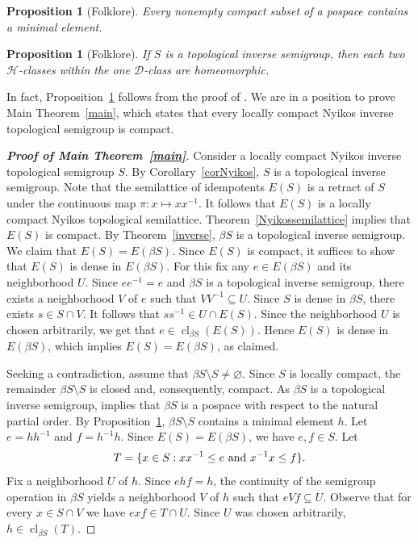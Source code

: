 \documentclass[12pt, twoside, leqno]{article}
\newtheorem{proposition}[theorem]{Proposition}
\theoremstyle{definition}
\numberwithin{equation}{section}
\newcommand{\cl}{\operatorname{cl}}
\begin{document}
\begin{proposition}[Folklore]\label{minposet}
Every nonempty compact subset of a pospace contains a minimal element.    
\end{proposition}

\begin{proposition}[Folklore]\label{Dclass}
 If $S$ is a topological inverse semigroup, then each two $\mathcal H$-classes within the one $\mathcal D$-class are homeomorphic.   
\end{proposition}

In fact, Proposition~\ref{Dclass} follows from the proof of \cite[Lemma~2.2.3]{Howie}. We are in a position to prove Main Theorem~\ref{main}, which states that every locally compact Nyikos inverse topological semigroup is compact. 

\begin{proof}[{\bf Proof of Main Theorem~\ref{main}}]
Consider a locally compact Nyikos inverse topological semigroup $S$. By Corollary~\ref{corNyikos}, $S$ is a topological inverse semigroup. Note that the semilattice of idempotents $E(S)$ is a retract of $S$ under the continuous map $\pi: x\mapsto xx^{-1}$. It follows that $E(S)$ is a locally compact Nyikos topological semilattice. Theorem~\ref{Nyikossemilattice} implies that $E(S)$ is compact. By Theorem~\ref{inverse}, $\beta S$ is a topological inverse semigroup. We claim that $E(S)=E(\beta S)$. Since $E(S)$ is compact, it suffices to show that $E(S)$ is dense in $E(\beta S)$. For this fix any $e\in E(\beta S)$ and its neighborhood $U$. Since $ee^{-1}=e$ and $\beta S$ is a topological inverse semigroup, there exists a neighborhood $V$ of $e$ such that $VV^{-1}\subseteq U$. Since $S$ is dense in $\beta S$, there exists $s\in S\cap V$. It follows that $ss^{-1}\in U\cap E(S)$. Since the neighborhood $U$ is chosen arbitrarily, we get that $e\in\cl_{\beta S}(E(S))$. Hence $E(S)$ is dense in $E(\beta S)$, which implies $E(S)=E(\beta S)$, as claimed.

Seeking a contradiction, assume that $\beta S\setminus S\neq \varnothing$. Since $S$ is locally compact, the remainder $\beta S\setminus S$ is closed and, consequently, compact. As $\beta S$ is a topological inverse semigroup, \cite[Proposition~3.8]{MPU} implies that $\beta S$ is a pospace with respect to the natural partial order. By Proposition~\ref{minposet}, $\beta S\setminus S$ contains a minimal element $h$. Let $e=hh^{-1}$ and $f=h^{-1}h$. Since $E(S)=E(\beta S)$, we have $e,f\in S$.  
Let $$T=\{x\in S: xx^{-1}\leq e \hbox{ and } x^{-1}x\leq f\}.$$ Fix a neighborhood $U$ of $h$. Since $ehf=h$, the continuity of the semigroup operation in $\beta S$ yields a neighborhood $V$ of $h$ such that $eVf\subseteq U$. Observe that for every $x\in S\cap V$ we have $exf\in T\cap U$. Since $U$ was chosen arbitrarily, $h\in \cl_{\beta S}(T)$.



\end{proof}
\end{document}
